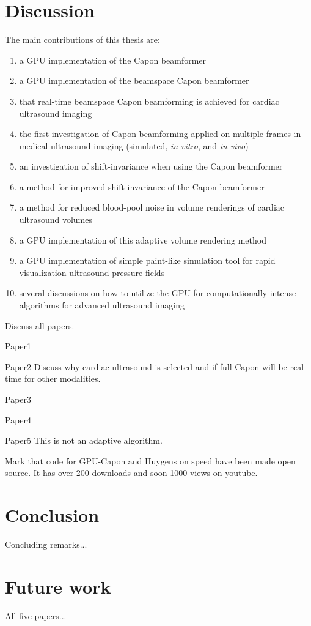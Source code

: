 \section{Discussion}
The main contributions of this thesis are:
\begin{enumerate}
\item a GPU implementation of the Capon beamformer
\item a GPU implementation of the beamspace Capon beamformer
\item that real-time beamspace Capon beamforming is achieved for cardiac ultrasound imaging
\item the first investigation of Capon beamforming applied on multiple frames in medical ultrasound imaging (simulated, \textit{in-vitro}, and \textit{in-vivo})
\item an investigation of shift-invariance when using the Capon beamformer
\item a method for improved shift-invariance of the Capon beamformer
\item a method for reduced blood-pool noise in volume renderings of cardiac ultrasound volumes
\item a GPU implementation of this adaptive volume rendering method
\item a GPU implementation of simple paint-like simulation tool for rapid visualization ultrasound pressure fields
\item several discussions on how to utilize the GPU for computationally intense algorithms for advanced ultrasound imaging 
\end{enumerate}

Discuss all papers.

Paper1

Paper2
Discuss why cardiac ultrasound is selected and if full Capon will be real-time for other modalities.

Paper3

Paper4

Paper5
This is not an adaptive algorithm.

Mark that code for GPU-Capon and Huygens on speed have been made open source.
It has over 200 downloads and soon 1000 views on youtube.

\section{Conclusion}

Concluding remarks...

\section{Future work}

All five papers...

\endinput